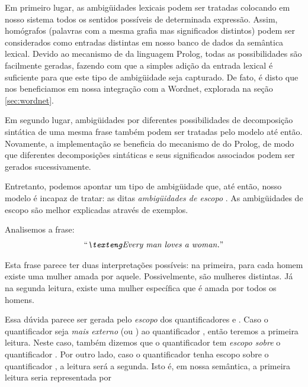 Em primeiro lugar, as ambigüidades lexicais podem ser tratadas colocando em nosso sistema todos os sentidos possíveis de determinada expressão. Assim, homógrafos (palavras com a mesma grafia mas significados distintos) podem ser considerados como entradas distintas em nosso banco de dados da semântica lexical. Devido ao mecanismo de  da linguagem Prolog, todas as possibilidades são facilmente geradas, fazendo com que a simples adição da entrada lexical é suficiente para que este tipo de ambigüidade seja capturado. De fato, é disto que nos beneficiamos em nossa integração com a Wordnet, explorada na seção \ref{sec:wordnet}.

Em segundo lugar, ambigüidades por diferentes possibilidades de decomposição sintática de uma mesma frase também podem ser tratadas pelo modelo até então. Novamente, a implementação se beneficia do mecanismo de  do Prolog, de modo que diferentes decomposições sintáticas e seus significados associados podem ser gerados sucessivamente.


Entretanto, podemos apontar um tipo de ambigüidade que, até então, nosso modelo é incapaz de tratar: as ditas \textit{ambigüidades de escopo} \citep[p.~105-109]{BlackburnBos:2005}. As ambigüidades de escopo são melhor explicadas através de exemplos.

Analisemos a frase: 
\begin{align*}
\text{\expreng{Every man loves a woman.}}
\end{align*}%

Esta frase parece ter duas interpretações possíveis: na primeira, para cada homem existe uma mulher amada por aquele. Possivelmente, são mulheres distintas. Já na segunda leitura, existe uma mulher específica que é amada por todos os homens.

\update Essa dúvida parece ser gerada pelo \textit{escopo} dos quantificadores  e . Caso o quantificador  seja \textit{mais externo} (ou \textit{}) ao quantificador , então teremos a primeira leitura. Neste caso, também dizemos que o quantificador  tem \textit{escopo sobre} o quantificador . Por outro lado, caso o quantificador  tenha escopo sobre o quantificador , a leitura será a segunda. Isto é, em nossa semântica, a primeira leitura seria representada por

